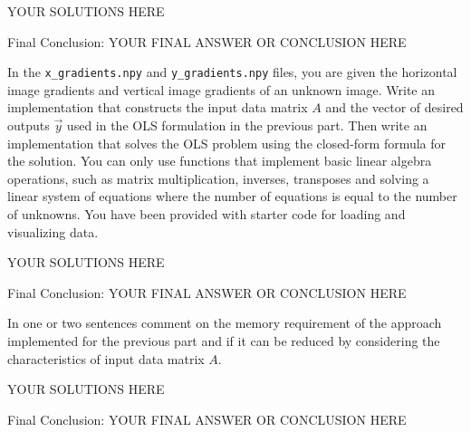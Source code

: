 \begin{solution}

YOUR SOLUTIONS HERE

{\color{red} Final Conclusion: YOUR FINAL ANSWER OR CONCLUSION HERE}

\end{solution}

\qpart{[5 points]} 
In the \texttt{x\_gradients.npy} and \texttt{y\_gradients.npy} files, you are given the horizontal image gradients and vertical image gradients of an unknown image. Write an implementation that constructs the input data matrix $A$ and the vector of desired outputs $\vec{y}$ used in the OLS formulation in the previous part. Then write an implementation that solves the OLS problem using the closed-form formula for the solution. You can only use functions that implement basic linear algebra operations, such as matrix multiplication, inverses, transposes and solving a linear system of equations where the number of equations is equal to the number of unknowns. You have been provided with starter code for loading and visualizing data. 

\begin{solution}

YOUR SOLUTIONS HERE

{\color{red} Final Conclusion: YOUR FINAL ANSWER OR CONCLUSION HERE}

\end{solution}

In one or two sentences comment on the memory requirement of the approach implemented for the previous part and if it can be reduced by considering the characteristics of input data matrix $A$.

\begin{solution}

YOUR SOLUTIONS HERE

{\color{red} Final Conclusion: YOUR FINAL ANSWER OR CONCLUSION HERE}

\end{solution}
